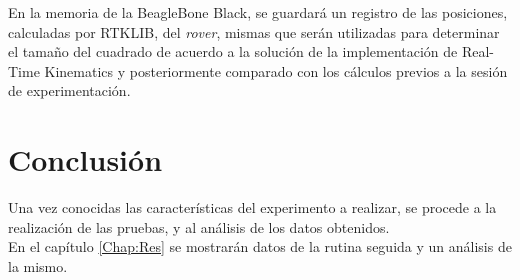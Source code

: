 En la memoria de la BeagleBone Black, se guardará un registro de las posiciones, calculadas por RTKLIB, del \textit{rover}, mismas que serán utilizadas para determinar el tamaño del cuadrado de acuerdo a la solución de la implementación de Real-Time Kinematics y posteriormente comparado con los cálculos previos a la sesión de experimentación.

\section{Conclusión}

Una vez conocidas las características del experimento a realizar, se procede a la realización de las pruebas, y al análisis de los datos obtenidos.\\

En el capítulo \ref{Chap:Res} se mostrarán datos de la rutina seguida y un análisis de la mismo.